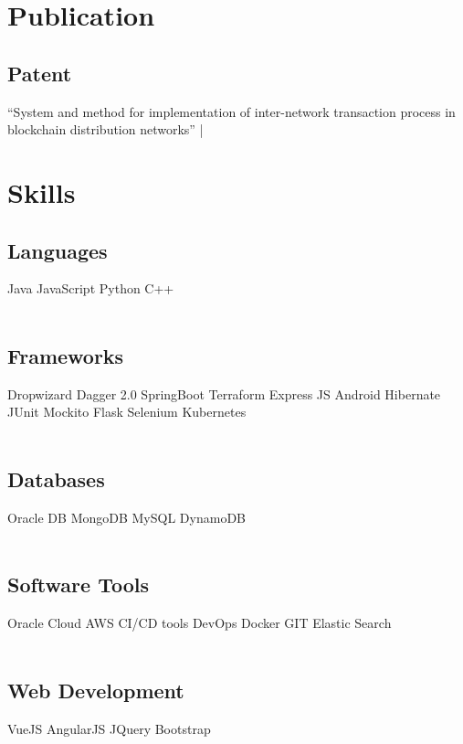 \documentclass[]{resume-openfont}
\begin{document}
\begin{minipage}[t]{0.33\textwidth}
\section{Publication}
\subsection{Patent}
“System and method for implementation of inter-network transaction process in blockchain distribution networks”  | \href{https://patentscope.wipo.int/search/en/detail.jsf?docId=IN326376132}{\faLink}



\section{Skills}
\subsection{Languages}
Java \textbullet{}   JavaScript \textbullet{} Python \textbullet{} C++ \\~\\
\subsection{Frameworks}
Dropwizard \textbullet{} Dagger 2.0 \textbullet{} SpringBoot \textbullet{} Terraform \textbullet{} Express JS \textbullet{} Android \textbullet{} Hibernate \textbullet{} JUnit \textbullet{} Mockito \textbullet{} Flask \textbullet{} Selenium \textbullet{} Kubernetes\\~\\
\subsection{Databases}
Oracle DB \textbullet{} MongoDB \textbullet{} MySQL \textbullet{} DynamoDB \\~\\
\subsection{Software Tools}
Oracle Cloud \textbullet{} AWS \textbullet{} CI/CD tools \textbullet{} DevOps \textbullet{} Docker \textbullet{} GIT \textbullet{} Elastic Search \\~\\
\subsection{Web Development}
VueJS \textbullet{}  AngularJS \textbullet{} JQuery \textbullet{} Bootstrap \\~\\

%
%

\end{minipage}
\end{document}
